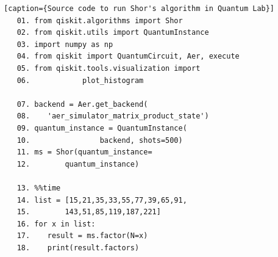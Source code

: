 \begin{lstlisting} [caption={Source code to run Shor's algorithm in Quantum Lab}]
    01. from qiskit.algorithms import Shor
    02. from qiskit.utils import QuantumInstance
    03. import numpy as np
    04. from qiskit import QuantumCircuit, Aer, execute
    05. from qiskit.tools.visualization import
    06.            plot_histogram

    07. backend = Aer.get_backend(
    08.    'aer_simulator_matrix_product_state')
    09. quantum_instance = QuantumInstance(
    10.                backend, shots=500)
    11. ms = Shor(quantum_instance=
    12.        quantum_instance)

    13. %%time
    14. list = [15,21,35,33,55,77,39,65,91,
    15.        143,51,85,119,187,221]
    16. for x in list:
    17.    result = ms.factor(N=x)
    18.    print(result.factors)
\end{lstlisting}

